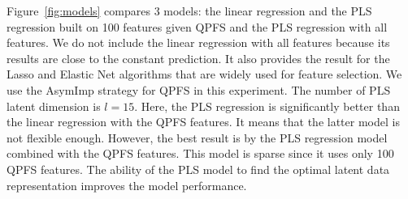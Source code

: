 \documentclass[12pt,twoside]{article}
\theoremstyle{definition}
\begin{document}
Figure~\ref{fig:models} compares 3 models: the linear regression and the PLS regression built on 100 features given QPFS and the PLS regression with all features.
We do not include the linear regression with all features because its results are close to the constant prediction. It also provides the result for the Lasso and Elastic Net algorithms that are widely used for feature selection.
We use the AsymImp strategy for QPFS in this experiment.
The number of PLS latent dimension is $l = 15$.
Here, the PLS regression is significantly better than the linear regression with the QPFS features.
It means that the latter model is not flexible enough.
However, the best result is by the PLS regression model combined with the QPFS features. 
This model is sparse since it uses only 100 QPFS features.
The ability of the PLS model to find the optimal latent data representation improves the model performance. 
\end{document}
